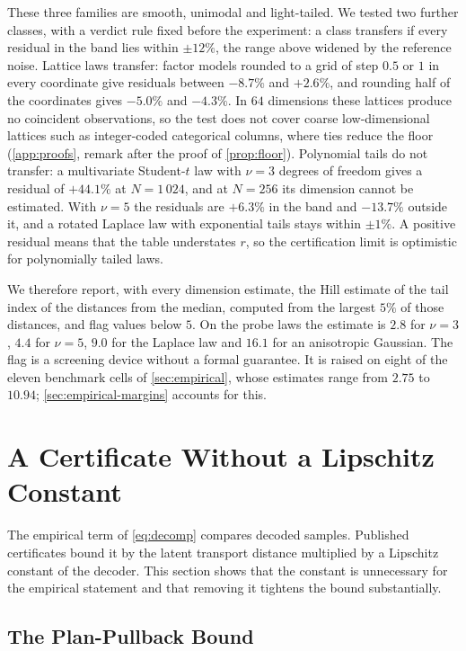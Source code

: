 \documentclass[twoside,11pt]{article}
\theoremstyle{plain}
\theoremstyle{definition}
\theoremstyle{remark}
\begin{document}
These three families are smooth, unimodal and light-tailed. We tested two
further classes, with a verdict rule fixed before the experiment: a class
transfers if every residual in the band lies within $\pm 12\%$, the range
above widened by the reference noise. Lattice laws transfer: factor models
rounded to a grid of step $0.5$ or $1$ in every coordinate give residuals
between $-8.7\%$ and $+2.6\%$, and rounding half of the coordinates gives
$-5.0\%$ and $-4.3\%$. In $64$ dimensions these lattices produce no
coincident observations, so the test does not cover coarse low-dimensional
lattices such as integer-coded categorical columns, where ties reduce the
floor (\cref{app:proofs}, remark after the proof of \cref{prop:floor}).
Polynomial tails do not transfer: a multivariate Student-$t$ law with
$\nu = 3$ degrees of freedom gives a residual of $+44.1\%$ at $N = 1\,024$,
and at $N = 256$ its dimension cannot be estimated. With $\nu = 5$ the
residuals are $+6.3\%$ in the band and $-13.7\%$ outside it, and a rotated
Laplace law with exponential tails stays within $\pm 1\%$. A positive
residual means that the table understates $r$, so the certification limit is
optimistic for polynomially tailed laws.

We therefore report, with every dimension estimate, the Hill estimate \citep{hill1975} of the tail index of the distances from the median, computed from the largest
$5\%$ of those distances, and flag values below $5$. On the probe laws the
estimate is $2.8$ for $\nu = 3$, $4.4$ for $\nu = 5$, $9.0$ for the Laplace
law and $16.1$ for an anisotropic Gaussian. The flag is a screening device
without a formal guarantee. It is raised on eight of the eleven benchmark
cells of \cref{sec:empirical}, whose estimates range from $2.75$ to
$10.94$; \cref{sec:empirical-margins} accounts for this.

\section{A Certificate Without a Lipschitz Constant}\label{sec:pullback}

The empirical term of \cref{eq:decomp} compares decoded samples. Published
certificates bound it by the latent transport distance multiplied by a
Lipschitz constant of the decoder. This section shows that the constant is
unnecessary for the empirical statement and that removing it tightens the
bound substantially.

\subsection{The Plan-Pullback Bound}\label{sec:pullback-bound}
\end{document}
